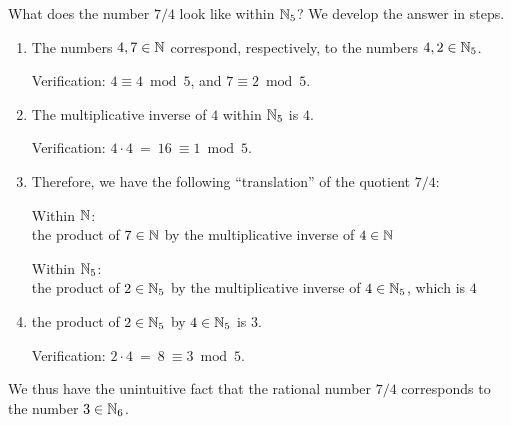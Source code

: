 What does the number $7/4$ look like within $\mathbb{N}_5$?  We develop the answer in steps.

\medskip

\noindent {}

\medskip

\begin{enumerate}
\item
The numbers $4, 7 \in \mathbb{N}$ correspond, respectively, to the numbers $4, 2 \in \mathbb{N}_5$.

\smallskip

Verification:
$4 \equiv 4 \bmod 5$, and $7 \equiv 2 \bmod 5$.

\medskip\item
The multiplicative inverse of $4$ within $\mathbb{N}_5$ is $4$.

\smallskip

Verification:
$4 \cdot 4 \ = \ 16 \ \equiv 1 \bmod 5$.

\medskip\item
Therefore, we have the following ``translation'' of the quotient $7/4$:

\smallskip

Within $\mathbb{N}$: \\
the product of $7 \in \mathbb{N}$ by the multiplicative inverse of $4 \in \mathbb{N}$

\smallskip

Within $\mathbb{N}_5$: \\
the product of $2 \in \mathbb{N}_5$ by the multiplicative inverse of $4 \in \mathbb{N}_5$, which is $4$

\medskip\item
the product of $2 \in \mathbb{N}_5$ by $4 \in \mathbb{N}_5$ is $3$.

\smallskip

Verification:
$2 \cdot 4 \ = \ 8 \ \equiv 3 \bmod 5$.
\end{enumerate}
We thus have the unintuitive fact that the rational number $7/4$ corresponds to the number $3 \in \mathbb{N}_6$.

